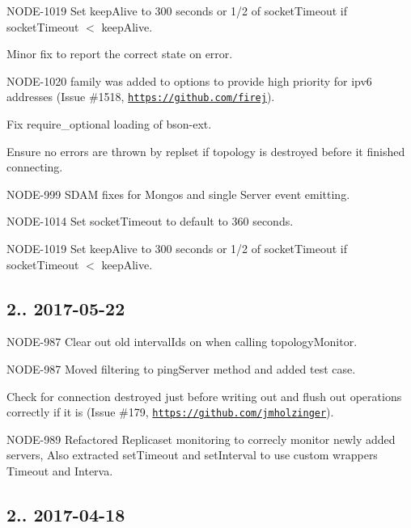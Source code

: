 \begin{DoxyItemize}
\item N\+O\+D\+E-\/1019 Set keep\+Alive to 300 seconds or 1/2 of socket\+Timeout if socket\+Timeout $<$ keep\+Alive.
\item Minor fix to report the correct state on error.
\item N\+O\+D\+E-\/1020 \textquotesingle{}family\textquotesingle{} was added to options to provide high priority for ipv6 addresses (Issue \#1518, \href{https://github.com/firej}{\tt https\+://github.\+com/firej}).
\item Fix require\+\_\+optional loading of bson-\/ext.
\item Ensure no errors are thrown by replset if topology is destroyed before it finished connecting.
\item N\+O\+D\+E-\/999 S\+D\+AM fixes for Mongos and single Server event emitting.
\item N\+O\+D\+E-\/1014 Set socket\+Timeout to default to 360 seconds.
\item N\+O\+D\+E-\/1019 Set keep\+Alive to 300 seconds or 1/2 of socket\+Timeout if socket\+Timeout $<$ keep\+Alive.
\end{DoxyItemize}

\subsection*{2.. 2017-\/05-\/22 }


\begin{DoxyItemize}
\item N\+O\+D\+E-\/987 Clear out old interval\+Ids on when calling topology\+Monitor.
\item N\+O\+D\+E-\/987 Moved filtering to ping\+Server method and added test case.
\item Check for connection destroyed just before writing out and flush out operations correctly if it is (Issue \#179, \href{https://github.com/jmholzinger}{\tt https\+://github.\+com/jmholzinger}).
\item N\+O\+D\+E-\/989 Refactored Replicaset monitoring to correcly monitor newly added servers, Also extracted set\+Timeout and set\+Interval to use custom wrappers Timeout and Interva.
\end{DoxyItemize}

\subsection*{2.. 2017-\/04-\/18 }


